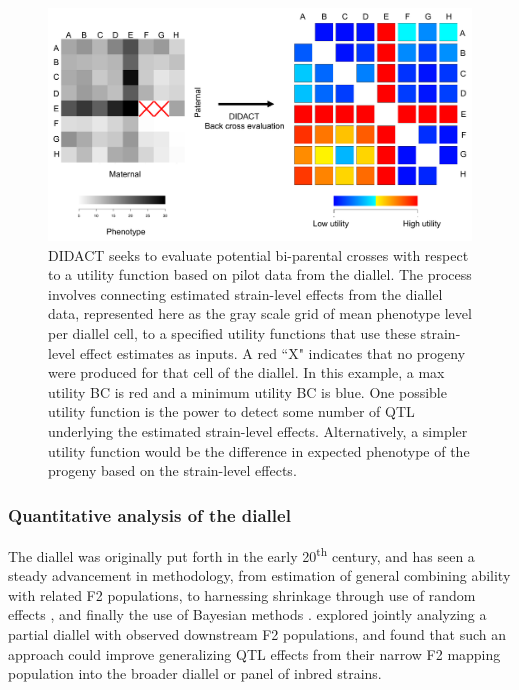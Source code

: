 \begin{figure}
\centering
\includegraphics[width=\textwidth, trim={0in 0in 0in 0.1in}, clip]{figures/1-introduction/didact_example.pdf}
\caption[Simplified representation of DIDACT]{DIDACT seeks to evaluate potential bi-parental crosses with respect to a utility function based on pilot data from the diallel. The process involves connecting estimated strain-level effects from the diallel data, represented here as the gray scale grid of mean phenotype level per diallel cell, to a specified utility functions that use these strain-level effect estimates as inputs. A red ``X" indicates that no progeny were produced for that cell of the diallel. In this example, a max utility BC is red and a minimum utility BC is blue. One possible utility function is the power to detect some number of QTL underlying the estimated strain-level effects. Alternatively, a simpler utility function would be the difference in expected phenotype of the progeny based on the strain-level effects. \label{fig:intro_didact_example}}
\end{figure}

\subsubsection{Quantitative analysis of the diallel}

The diallel was originally put forth in the early 20\textsuperscript{th} century, and has seen a steady advancement in methodology, from estimation of general combining ability \citep{Griffing1956} with related F2 populations, to harnessing shrinkage through use of random effects \citep{Zhu1996,Tsaih2005}, and finally the use of Bayesian methods \citep{Greenberg2010,Lenarcic2012}. \cite{Verhoeven2006} explored jointly analyzing a partial diallel with observed downstream F2 populations, and found that such an approach could improve generalizing QTL effects from their narrow F2 mapping population into the broader diallel or panel of inbred strains. 

